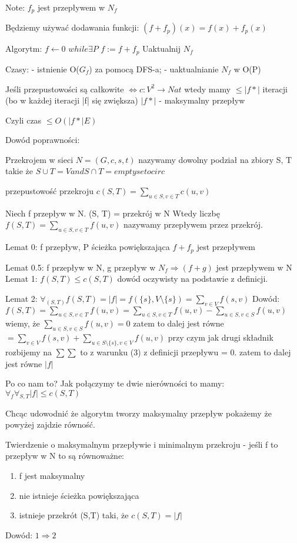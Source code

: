 Note: $f_p$ jest przepływem w $N_f$

Będziemy używać dodawania funkcji: $(f + f_p)(x) = f(x) + f_p(x)$

Algorytm:
    $f \leftarrow 0$
    $while \exists P$
        $f := f + f_p$
        Uaktualnij $N_f$

Czasy:
 - istnienie O($G_f$) za pomocą DFS-a;
 - uaktualnianie $N_f$ w O(P)

Jeśli przepustowości są całkowite $ \iff c: V^2 \rightarrow Nat$ wtedy mamy $\le |f*|$ iteracji (bo w każdej iteracji |f| się zwiększa)
$|f*|$ - maksymalny przepływ

Czyli czas $ \le O(|f*|E)$  

Dowód poprawności:

Przekrojem w sieci $N = (G,c,s,t)$ nazywamy dowolny podział na zbiory S, T takie że $S \cup T = V and S \cap T = emptysetocirc$

przepustowość przekroju $c(S,T) = \sum_{u \in S, v \in T} c(u,v)$

Niech f przepływ w N. (S, T) = przekrój w N
Wtedy liczbę $f(S,T) = \sum_{u \in S, v \in T} f(u,v)$ nazywamy przepływem przez przekrój.

Lemat 0: f przepływ, P ścieżka powiększająca $f + f_p$ jest przepływem 

Lemat 0.5: f przepływ w N, g przepływ w $N_f \Rightarrow (f + g)$ jest przepływem w N
Lemat 1: $f(S,T) \le c(S,T)$ dowód oczywisty na podstawie z definicji.

Lemat 2: $\forall_{(S,T)} f(S,T) = |f| = f(\{ s \}, V \setminus \{ s \} ) = \sum_{v \in V} f(s,v)$
Dowód: $f(S,T) = \sum_{u \in S, v \in T} f(u,v) = \sum_{u \in S, v \in T} f(u,v) - \sum_{u \in S, v \in S} f(u,v) $
wiemy, że $\sum_{u \in S, v \in S} f(u,v) = 0$
zatem to dalej jest równe $ = \sum_{v \in V} f(s,v) + \sum_{u \in S \setminus \{ s \}, v \in V } f(u,v)$
przy czym jak drugi składnik rozbijemy na $\sum \sum$ to z warunku (3) z definicji przepływu = 0.
zatem to dalej jest równe $ |f| $


Po co nam to?
Jak połączymy te dwie nierówności to mamy:
$\forall_f \forall_{S, T} |f| \le c(S,T)$

Chcąc udowodnić że algorytm tworzy maksymalny przepływ pokażemy że powyżej zajdzie równość.

Twierdzenie o maksymalnym przepływie i minimalnym przekroju - jeśli f to przepływ w N to są równoważne:
\begin{enumerate}
    \item f jest maksymalny
    \item nie istnieje ścieżka powiększająca
    \item istnieje przekrót (S,T) taki, że $ c(S,T) = |f|$
    
\end{enumerate}

Dowód: $1 \Rightarrow 2$


